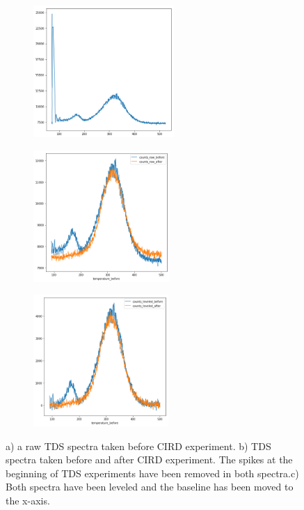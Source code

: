 \documentclass{article}
\begin{document}
\begin{figure}[h]
\begin{subfigure}{0.5\textwidth}
\includegraphics[width=0.9\linewidth, height=5cm]{tds_raw.png}
\caption{}
\label{fig:subim2-a}
\end{subfigure}
\begin{subfigure}{0.5\textwidth}
\includegraphics[width=0.9\linewidth, height=5cm]{spike_remove.png}
\caption{}
\label{fig:subim2-b}
\end{subfigure}
\begin{subfigure}{0.5\textwidth}
\includegraphics[width=0.9\linewidth, height=5cm]{leveled.png}
\caption{}
\label{fig:subim2-c}
\end{subfigure}
    \caption{a) a raw TDS spectra taken before CIRD experiment. b) TDS spectra
    taken before and after CIRD experiment. The spikes at the
    beginning of TDS experiments have been removed in both spectra.c) Both
    spectra have been leveled and the baseline has been moved to the x-axis.}
\label{fig:image2}
\end{figure}
\end{document}
